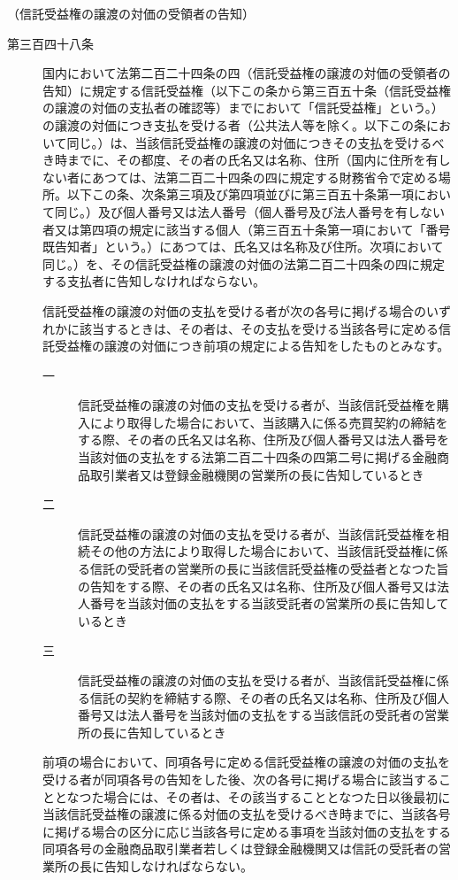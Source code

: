 \documentclass[twocolumn,a4j,10pt]{ltjtarticle}
\begin{document}
\noindent\hspace{10pt}（信託受益権の譲渡の対価の受領者の告知）
\begin{description}
\item[第三百四十八条]国内において法第二百二十四条の四（信託受益権の譲渡の対価の受領者の告知）に規定する信託受益権（以下この条から第三百五十条（信託受益権の譲渡の対価の支払者の確認等）までにおいて「信託受益権」という。）の譲渡の対価につき支払を受ける者（公共法人等を除く。以下この条において同じ。）は、当該信託受益権の譲渡の対価につきその支払を受けるべき時までに、その都度、その者の氏名又は名称、住所（国内に住所を有しない者にあつては、法第二百二十四条の四に規定する財務省令で定める場所。以下この条、次条第三項及び第四項並びに第三百五十条第一項において同じ。）及び個人番号又は法人番号（個人番号及び法人番号を有しない者又は第四項の規定に該当する個人（第三百五十条第一項において「番号既告知者」という。）にあつては、氏名又は名称及び住所。次項において同じ。）を、その信託受益権の譲渡の対価の法第二百二十四条の四に規定する支払者に告知しなければならない。
\item[]信託受益権の譲渡の対価の支払を受ける者が次の各号に掲げる場合のいずれかに該当するときは、その者は、その支払を受ける当該各号に定める信託受益権の譲渡の対価につき前項の規定による告知をしたものとみなす。
\begin{description}
\item[一]信託受益権の譲渡の対価の支払を受ける者が、当該信託受益権を購入により取得した場合において、当該購入に係る売買契約の締結をする際、その者の氏名又は名称、住所及び個人番号又は法人番号を当該対価の支払をする法第二百二十四条の四第二号に掲げる金融商品取引業者又は登録金融機関の営業所の長に告知しているとき
\item[二]信託受益権の譲渡の対価の支払を受ける者が、当該信託受益権を相続その他の方法により取得した場合において、当該信託受益権に係る信託の受託者の営業所の長に当該信託受益権の受益者となつた旨の告知をする際、その者の氏名又は名称、住所及び個人番号又は法人番号を当該対価の支払をする当該受託者の営業所の長に告知しているとき
\item[三]信託受益権の譲渡の対価の支払を受ける者が、当該信託受益権に係る信託の契約を締結する際、その者の氏名又は名称、住所及び個人番号又は法人番号を当該対価の支払をする当該信託の受託者の営業所の長に告知しているとき
\end{description}
\item[]前項の場合において、同項各号に定める信託受益権の譲渡の対価の支払を受ける者が同項各号の告知をした後、次の各号に掲げる場合に該当することとなつた場合には、その者は、その該当することとなつた日以後最初に当該信託受益権の譲渡に係る対価の支払を受けるべき時までに、当該各号に掲げる場合の区分に応じ当該各号に定める事項を当該対価の支払をする同項各号の金融商品取引業者若しくは登録金融機関又は信託の受託者の営業所の長に告知しなければならない。

\end{description}
\end{document}
